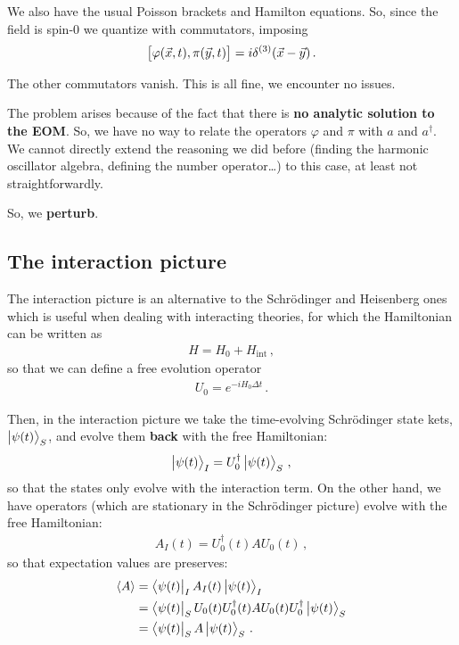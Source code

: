 \documentclass[main.tex]{subfiles}
\begin{document}
We also have the usual Poisson brackets and Hamilton equations. 
So, since the field is spin-0 we quantize with commutators, imposing 
%
\begin{align}
\qty[\varphi (\vec{x}, t) , \pi (\vec{y}, t)] = i \delta^{(3)} (\vec{x}-\vec{y})
\,.
\end{align}

The other commutators vanish. 
This is all fine, we encounter no issues.

The problem arises because of the fact that there is \textbf{no analytic solution to the EOM}. 
So, we have no way to relate the operators \(\varphi \) and \(\pi \) with \(a\) and \(a ^\dag\). We cannot directly extend the reasoning we did before (finding the harmonic oscillator algebra, defining the number operator\dots) to this case, at least not straightforwardly. 

So, we \textbf{perturb}. 

\subsection{The interaction picture}

The interaction picture is an alternative to the Schrödinger and Heisenberg ones which is useful when dealing with interacting theories, for which the Hamiltonian can be written as 
%
\begin{align}
H = H_0 + H _{\text{int}}
\,,
\end{align}
%
so that we can define a free evolution operator 
%
\begin{align}
U_0 = e^{-i H_0 \Delta t}
\,.
\end{align}

Then, in the interaction picture we take the time-evolving Schrödinger state kets, \(\ket{\psi (t)}_{S}\), and evolve them \textbf{back} with the free Hamiltonian: 
%
\begin{align}
\ket{\psi (t)}_{I} = U_0 ^\dag \ket{\psi (t)}_{S}
\,,
\end{align}
%
so that the states only evolve with the interaction term. 
On the other hand, we have operators (which are stationary in the Schrödinger picture) evolve with the free Hamiltonian:
%
\begin{align}
A_{I}(t) = U_0 ^\dag (t) A U_0 (t)
\,,
\end{align}
%
so that expectation values are preserves: 
%
\begin{subequations}
\begin{align}
\expval{A} &= \bra{\psi (t)}_{I} A_I (t) \ket{\psi (t)}_{I}   \\
&= \bra{\psi (t)}_{S} U_0 (t) U_0 ^\dag(t) A U_0 (t) U_0 ^\dag \ket{\psi (t)}_{S}  \\
&=  \bra{\psi (t)}_{S} A \ket{\psi (t)}_{S}
\,.
\end{align}
\end{subequations}
\end{document}
